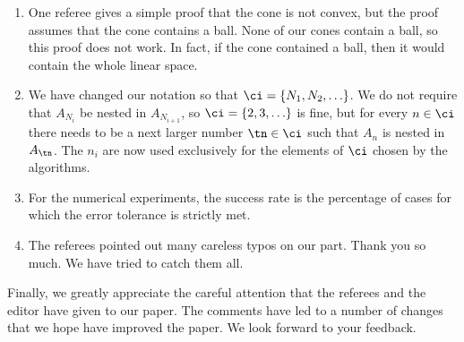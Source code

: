 \documentclass[11pt]{article}
\begin{document}
\begin{enumerate}
\item One referee gives a simple proof that the cone is not convex, but the proof assumes that the cone contains a ball.  None of our cones contain a ball, so this proof does not work.  In fact, if the cone contained a ball, then it would contain the whole linear space.

\item We have changed our notation so that $\ci=\{N_1, N_2, \ldots \}$.  We do not require that $A_{N_i}$ be nested in $A_{N_{i+1}}$, so $\ci=\{2,3, \ldots\}$ is fine, but for every $n \in \ci$ there needs to be a next larger number $\tn \in \ci$ such that $A_n$ is nested in $A_{\tn}$.  The $n_i$ are now used exclusively for the elements of $\ci$ chosen by the algorithms.

\item For the numerical experiments, the success rate is the percentage of cases for which the error tolerance is strictly met.

\item The referees pointed out many careless typos on our part.  Thank you so much.  We have tried to catch them all.

\end{enumerate}

Finally, we greatly appreciate the careful attention that the referees and the editor have given to our paper.  The comments have led to a number of changes that we hope have improved the paper.  We look forward to your feedback.



\end{document}
